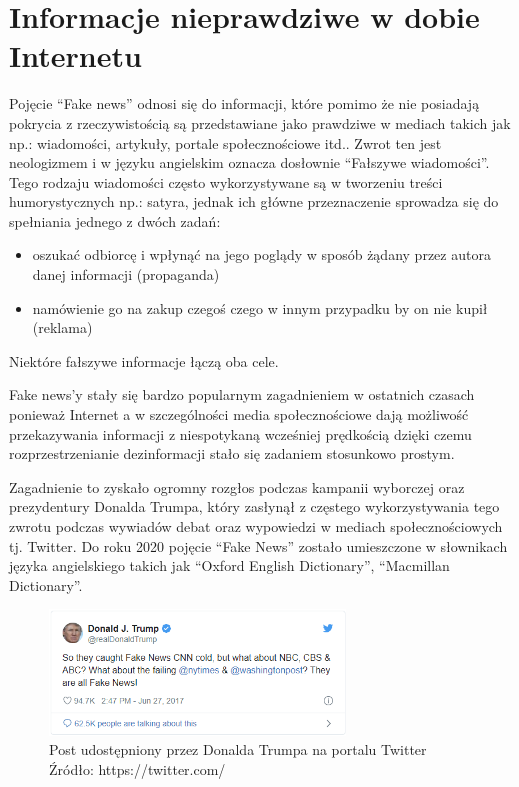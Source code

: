 \chapter{Informacje nieprawdziwe w dobie Internetu}
Pojęcie ``Fake news'' odnosi się do 
informacji, które pomimo że nie posiadają pokrycia z rzeczywistością są 
przedstawiane jako prawdziwe w mediach takich jak np.: wiadomości, artykuły, 
portale społecznościowe itd.. 
Zwrot ten jest neologizmem i w języku angielskim oznacza dosłownie ``Fałszywe wiadomości''.
Tego rodzaju wiadomości często wykorzystywane są w tworzeniu treści humorystycznych 
np.: satyra, jednak ich główne przeznaczenie sprowadza się do spełniania jednego z dwóch zadań:
\begin{itemize}
    \item oszukać odbiorcę i wpłynąć na jego poglądy w sposób żądany przez autora danej informacji (propaganda)
    \item namówienie go na zakup czegoś czego w innym przypadku by on nie kupił (reklama)
\end{itemize} 
Niektóre fałszywe informacje łączą oba cele.

Fake news'y stały się bardzo popularnym zagadnieniem w ostatnich czasach ponieważ
Internet a w szczególności media społecznościowe dają możliwość przekazywania
informacji z niespotykaną wcześniej prędkością dzięki czemu rozprzestrzenianie 
dezinformacji stało się zadaniem stosunkowo prostym.

Zagadnienie to zyskało ogromny rozgłos podczas kampanii wyborczej oraz
prezydentury Donalda Trumpa, który zasłynął z częstego wykorzystywania 
tego zwrotu podczas wywiadów debat oraz wypowiedzi w mediach społecznościowych
tj. Twitter.
Do roku 2020 pojęcie ``Fake News'' zostało umieszczone w słownikach języka angielskiego
takich jak ``Oxford English Dictionary'', ``Macmillan Dictionary''.
\begin{figure}[h!]
    \centering
    \includegraphics[width=0.7\textwidth]{./Img/Trump-Fake-News.png}
    \caption{Post udostępniony przez Donalda Trumpa na portalu Twitter Źródło: https://twitter.com/}
\end{figure}

